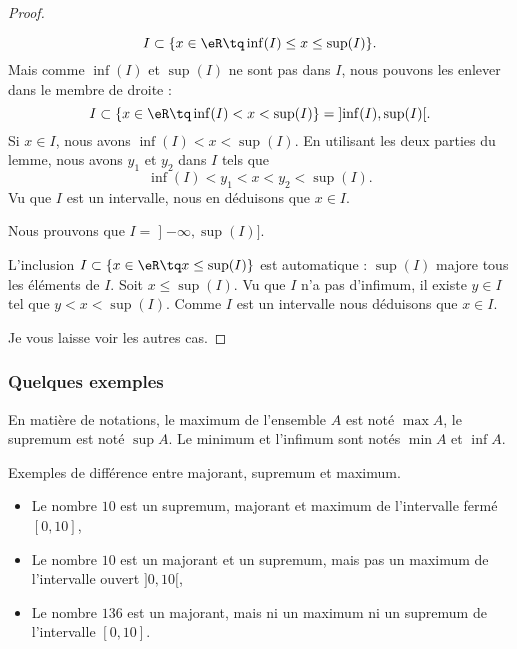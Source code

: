 \begin{proof}
\begin{subproof}
\begin{subproof}
\begin{equation}
						I\subset\{ x\in \eR\tq \inf(I)\leq x\leq \sup(I) \}.
					\end{equation}
					Mais comme \( \inf(I)\) et \( \sup(I)\) ne sont pas dans \( I\), nous pouvons les enlever dans le membre de droite :
					\begin{equation}
						I\subset\{ x\in \eR\tq \inf(I)<x<\sup(I) \}= \mathopen] \inf(I) , \sup(I) \mathclose[.
					\end{equation}
					Si \( x\in I\), nous avons \( \inf(I)<x<\sup(I)\). En utilisant les deux parties du lemme, nous avons \( y_1\) et \( y_2\) dans \( I\) tels que
					\begin{equation}
						\inf(I)<y_1<x<y_2<\sup(I).
					\end{equation}
					Vu que \( I\) est un intervalle, nous en déduisons que \( x\in I\).
				\end{subproof}
				\spitem[\( \inf(I)=-\infty\), \( \sup(I)\in I\)]
				Nous prouvons que \( I=\mathopen] -\infty , \sup(I) \mathclose]\).
		\begin{subproof}
			L'inclusion \( I\subset\{ x\in \eR\tq x\leq \sup(I) \}\) est automatique : \( \sup(I)\) majore tous les éléments de \( I\).
			Soit \( x\leq \sup(I)\). Vu que \( I\) n'a pas d'infimum, il existe \( y\in I\) tel que \( y<x<\sup(I)\). Comme \( I\) est un intervalle nous déduisons que \( x\in I\).
		\end{subproof}
	\end{subproof}
	Je vous laisse voir les autres cas.
\end{proof}


\subsubsection{Quelques exemples}

En matière de notations, le maximum de l'ensemble \( A\) est noté \( \max A\), le supremum est noté \( \sup A\). Le minimum et l'infimum sont notés \( \min A\) et \( \inf A\).

\begin{example}
	Exemples de différence entre majorant, supremum et maximum.
	\begin{itemize}
		\item Le nombre \( 10\) est un supremum, majorant et maximum de l'intervalle fermé \( [0,10]\),
		\item Le nombre \( 10\) est un majorant et un supremum, mais pas un maximum de l'intervalle ouvert \( ]0,10[\),
		\item Le nombre \( 136\) est un majorant, mais ni un maximum ni un supremum de l'intervalle \( [0,10]\).
	\end{itemize}
\end{example}

